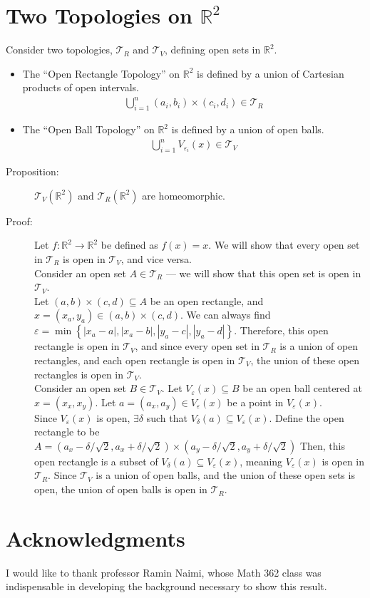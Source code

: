 \documentclass[12pt]{extarticle}
\newcommand{\R}{\mathbb{R}}
\begin{document}
  \section*{Two Topologies on $\R^2$}%
  Consider two topologies, $ \mathcal{T}_R $ and $ \mathcal{T}_V $, defining open sets in $\R^2$.
  \begin{itemize}
    \item The ``Open Rectangle Topology'' on $\R^2$ is defined by a union of Cartesian products of open intervals.
      \begin{align*}
        \bigcup_{i=1}^{n}(a_i,b_i)\times(c_i,d_i) \in \mathcal{T}_R
      \end{align*}
    \item The ``Open Ball Topology'' on $\R^2$ is defined by a union of open balls.
      \begin{align*}
        \bigcup_{i=1}^{n}V_{\varepsilon_i}(x) \in \mathcal{T}_V
      \end{align*}
  \end{itemize}
  \begin{description}
    \item[Proposition:]$ \mathcal{T}_V(\R^2) $ and $ \mathcal{T}_R(\R^2) $ are homeomorphic.
    \item[Proof:] Let $f: \R^2 \rightarrow \R^2$ be defined as $f(x) = x$. We will show that every open set in $\mathcal{T}_R$ is open in $\mathcal{T}_V$, and vice versa.\\

      Consider an open set $A\in\mathcal{T}_R$ --- we will show that this open set is open in $\mathcal{T}_V$.\\

      Let $(a,b)\times(c,d)\subseteq A$ be an open rectangle, and $x = (x_a,y_a)\in (a,b)\times(c,d)$. We can always find $\varepsilon = \min\left\{|x_a-a|,|x_a-b|,|y_a-c|,|y_a-d|\right\}$. Therefore, this open rectangle is open in $\mathcal{T}_V$, and since every open set in $\mathcal{T}_R$ is a union of open rectangles, and each open rectangle is open in $\mathcal{T}_V$, the union of these open rectangles is open in $\mathcal{T}_V$.\\

      Consider an open set $B\in\mathcal{T}_V$. Let $V_{\varepsilon}(x)\subseteq B$ be an open ball centered at $x = (x_x,x_y)$. Let $a=(a_x,a_y)\in V_{\varepsilon}(x)$ be a point in $V_{\varepsilon}(x)$.\\

      Since $V_{\varepsilon}(x)$ is open, $\exists \delta$ such that $V_{\delta}(a)\subseteq V_{\varepsilon}(x)$. Define the open rectangle to be $A = (a_x-\delta/\sqrt{2},a_x+\delta/\sqrt{2})\times(a_y-\delta/\sqrt{2},a_y + \delta/\sqrt{2})$ Then, this open rectangle is a subset of $V_{\delta}(a)\subseteq V_{\varepsilon}(x)$, meaning $V_{\varepsilon}(x)$ is open in $\mathcal{T}_R$. Since $\mathcal{T}_V$ is a union of open balls, and the union of these open sets is open, the union of open balls is open in $\mathcal{T}_R$.
  \end{description}
  \section*{Acknowledgments}%
  I would like to thank professor Ramin Naimi, whose Math 362 class was indispensable in developing the background necessary to show this result.
  \printbibliography
\end{document}
